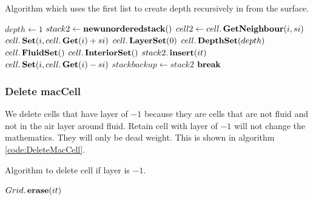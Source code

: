 		\begin{algorithm}
\caption{Algorithm which uses the first list to create depth recursively in from the surface.}
\label{code:CreateInteriorDepth3}
\begin{algorithmic}[1]
		\State $depth\gets 1$
		\Loop
			\State $stack2 \gets \mathop{\textbf{newunorderedstack}}()$ 
						\State $cell2 \gets cell.\mathop{\textbf{GetNeighbour}}(i,si)$
							\State $cell.\mathop{\textbf{Set}}(i,cell.\mathop{\textbf{Get}}(i)+si)$
							\State $cell.\mathop{\textbf{LayerSet}}(0)$
							\State $cell.\mathop{\textbf{DepthSet}}(depth)$
								\State $cell.\mathop{\textbf{FluidSet}}()$
							\Else
								\State $cell.\mathop{\textbf{InteriorSet}}()$ 
							\EndIf
							\State $stack2.\mathop{\textbf{insert}}(it)$ 
							\State $cell.\mathop{\textbf{Set}}(i,cell.\mathop{\textbf{Get}}(i)-si)$
						\EndIf
					\EndFor
				\EndFor
			\EndFor
			\State $stackbackup\gets stack2$ 
			 
				\State $\mathop{\textbf{break}}$
			\EndIf
		\EndLoop
	\EndProcedure
\end{algorithmic}
\end{algorithm}

\subsubsection{Delete macCell}

We delete cells that have layer of $-1$ because they are cells that are not fluid and not in the air layer around fluid.
Retain cell with layer of $-1$ will not change the mathematics. They will only be dead weight.
This is shown in algorithm \ref{code:DeleteMacCell}.
\begin{algorithm}
\caption{Algorithm to delete cell if layer is $-1$.}
\label{code:DeleteMacCell}
\begin{algorithmic}[1]
			\State $Grid.\mathop{\textbf{erase}}(it)$
		\EndIf
	\EndFor
\EndProcedure
\end{algorithmic}
\end{algorithm}


